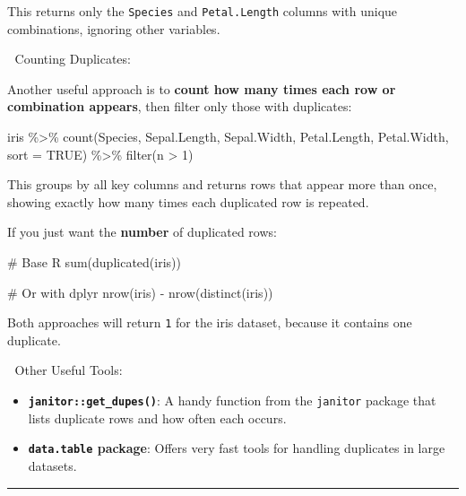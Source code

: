 \documentclass[
  man,
  floatsintext,
  longtable,
  nolmodern,
  notxfonts,
  notimes,
  colorlinks=true,linkcolor=blue,citecolor=blue,urlcolor=blue]{apa7}
\newenvironment{Shaded}{\begin{snugshade}}{\end{snugshade}}
\newcommand{\AttributeTok}[1]{\textcolor[rgb]{0.40,0.45,0.13}{#1}}
\newcommand{\CommentTok}[1]{\textcolor[rgb]{0.37,0.37,0.37}{#1}}
\newcommand{\ConstantTok}[1]{\textcolor[rgb]{0.56,0.35,0.01}{#1}}
\newcommand{\DecValTok}[1]{\textcolor[rgb]{0.68,0.00,0.00}{#1}}
\newcommand{\FunctionTok}[1]{\textcolor[rgb]{0.28,0.35,0.67}{#1}}
\newcommand{\NormalTok}[1]{\textcolor[rgb]{0.00,0.23,0.31}{#1}}
\newcommand{\SpecialCharTok}[1]{\textcolor[rgb]{0.37,0.37,0.37}{#1}}
\providecommand{\tightlist}{%
  \setlength{\itemsep}{0pt}\setlength{\parskip}{0pt}}
\begin{document}
This returns only the \texttt{Species} and \texttt{Petal.Length} columns
with unique combinations, ignoring other variables.

🔹 Counting Duplicates:

Another useful approach is to \textbf{count how many times each row or
combination appears}, then filter only those with duplicates:

\begin{Shaded}
\begin{Highlighting}[]
\NormalTok{iris }\SpecialCharTok{\%\textgreater{}\%}
  \FunctionTok{count}\NormalTok{(Species, Sepal.Length, Sepal.Width, Petal.Length, Petal.Width, }\AttributeTok{sort =} \ConstantTok{TRUE}\NormalTok{) }\SpecialCharTok{\%\textgreater{}\%}
  \FunctionTok{filter}\NormalTok{(n }\SpecialCharTok{\textgreater{}} \DecValTok{1}\NormalTok{)}
\end{Highlighting}
\end{Shaded}

This groups by all key columns and returns rows that appear more than
once, showing exactly how many times each duplicated row is repeated.

If you just want the \textbf{number} of duplicated rows:

\begin{Shaded}
\begin{Highlighting}[]
\CommentTok{\# Base R}
\FunctionTok{sum}\NormalTok{(}\FunctionTok{duplicated}\NormalTok{(iris))}

\CommentTok{\# Or with dplyr}
\FunctionTok{nrow}\NormalTok{(iris) }\SpecialCharTok{{-}} \FunctionTok{nrow}\NormalTok{(}\FunctionTok{distinct}\NormalTok{(iris))}
\end{Highlighting}
\end{Shaded}

Both approaches will return \texttt{1} for the iris dataset, because it
contains one duplicate.

🔹 Other Useful Tools:

\begin{itemize}
\tightlist
\item
  \textbf{\texttt{janitor::get\_dupes()}}: A handy function from the
  \texttt{janitor} package that lists duplicate rows and how often each
  occurs.
\item
  \textbf{\texttt{data.table} package}: Offers very fast tools for
  handling duplicates in large datasets.
\end{itemize}

\begin{center}\rule{0.5\linewidth}{0.5pt}\end{center}
\end{document}
